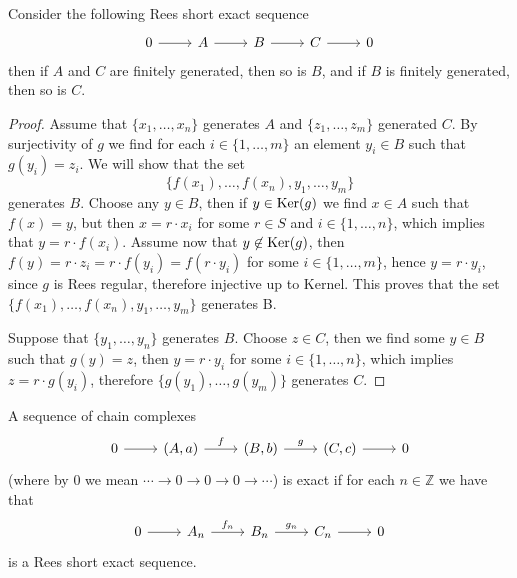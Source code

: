 \begin{proposition}
    Consider the following Rees short exact sequence
    \[\begin{tikzcd}
        0 & A & B & C & 0
        \arrow[from=1-1, to=1-2]
        \arrow[from=1-2, to=1-3]
        \arrow[from=1-3, to=1-4]
        \arrow[from=1-4, to=1-5]
    \end{tikzcd}\]
    then if $A$ and $C$ are finitely generated, then so is $B$, and if $B$ is finitely generated, then so is $C$.
\end{proposition}
\begin{proof}
    Assume that $\{x_1,\dots,x_n\}$ generates $A$ and $\{z_1,\dots,z_m\}$ generated $C$. By surjectivity of $g$ we find 
    for each $i\in\{1,\dots,m\}$ an element $y_i\in B$ such that $g(y_i)=z_i$. We will show that the set 
    \[
        \{f(x_1),\dots,f(x_n),y_1,\dots,y_m\}
    \]
    generates $B$. Choose any $y\in B$, then if $y\in\mathrm{Ker}(g)$ we find $x\in A$ such that $f(x)=y$, but then 
    $x=r\cdot x_i$ for some $r\in S$ and $i\in\{1,\dots,n\}$, which implies that $y=r\cdot f(x_i)$. Assume now that $y\not\in\mathrm{Ker}(g)$,
    then $f(y) = r\cdot z_i = r\cdot f(y_i) = f(r\cdot y_i)$ for some $i\in\{1,\dots,m\}$, hence $y=r\cdot y_i$, since $g$ is Rees regular, therefore 
    injective up to Kernel. This proves that the set $\{f(x_1),\dots,f(x_n),y_1,\dots,y_m\}$ generates B. \par 
    Suppose that $\{y_1,\dots,y_n\}$ generates $B$. Choose $z\in C$, then we find some $y\in B$ such that $g(y)=z$, then 
    $y=r\cdot y_i$ for some $i\in\{1,\dots,n\}$, which implies $z=r\cdot g(y_i)$, therefore $\{g(y_1),\dots,g(y_m)\}$ generates $C$.
\end{proof}
\begin{definition}
    A sequence of chain complexes 
\[\begin{tikzcd}
	0 & {(A,a)} & {(B,b)} & {(C,c)} & 0
	\arrow[from=1-1, to=1-2]
	\arrow["f", from=1-2, to=1-3]
	\arrow["g", from=1-3, to=1-4]
	\arrow[from=1-4, to=1-5]
\end{tikzcd}\]
    (where by $0$ we mean $\cdots\to 0\to0\to0\to\cdots$) is exact 
    if for each $n\in\mathbb{Z}$ we have that 
    \[\begin{tikzcd}
	0 & {A_n} & {B_n} & {C_n} & 0
        \arrow[from=1-1, to=1-2]
        \arrow["{f_n}", from=1-2, to=1-3]
        \arrow["{g_n}", from=1-3, to=1-4]
        \arrow[from=1-4, to=1-5]
    \end{tikzcd}\]
    is a Rees short exact sequence.
\end{definition}
